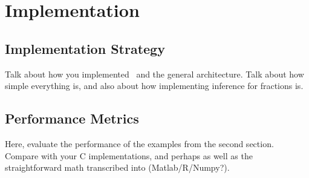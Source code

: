\section{Implementation}\label{sec:implementation}
\subsection{Implementation Strategy}


Talk about how you implemented \lang\ and the general
architecture. Talk about how simple everything is, and also
about how implementing inference for fractions is. 

\subsection{Performance Metrics}

Here, evaluate the performance of the examples from the second
section.  Compare with your C implementations, and perhaps as well as
the straightforward math transcribed into (Matlab/R/Numpy?).
